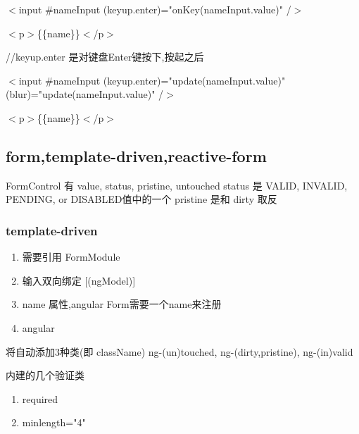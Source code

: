 \documentclass{article}
\begin{document}
$<$input \#nameInput (keyup.enter)="onKey(nameInput.value)" /$>$
\par $<$p$>$\{\{name\}\}$<$/p$>$
\par//keyup.enter 是对键盘Enter键按下,按起之后

$<$input \#nameInput (keyup.enter)="update(nameInput.value)" (blur)="update(nameInput.value)" /$>$
\par $<$p$>$\{\{name\}\}$<$/p$>$

\subsection{form,template-driven,reactive-form}

FormControl 有 value, status, pristine, untouched
status 是 VALID, INVALID, PENDING, or DISABLED值中的一个
pristine 是和 dirty 取反

\subsubsection{template-driven}
\begin{enumerate}
\item 需要引用 FormModule
\item 输入双向绑定 [(ngModel)] 
\item name 属性,angular Form需要一个name来注册
\item angular 
\end{enumerate}

将自动添加3种类(即 className) ng-(un)touched, ng-(dirty,pristine), ng-(in)valid

内建的几个验证类
\begin{enumerate}
\item required
\item minlength="4"
\end{enumerate}
\end{document}
